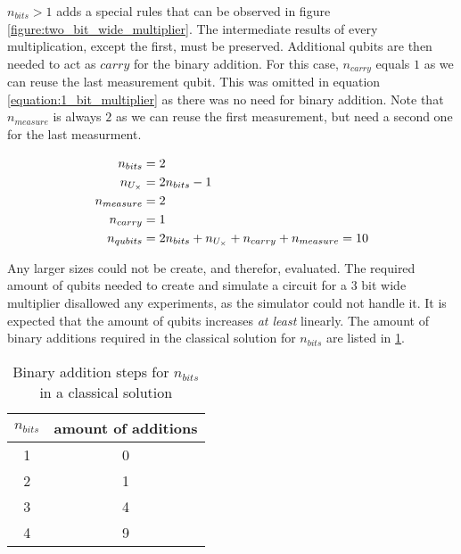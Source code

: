 $n_{bits} > 1$ adds a special rules that can be observed in figure \ref{figure:two_bit_wide_multiplier}. The intermediate results of every multiplication, except the first, must be preserved. Additional qubits are then needed to act as $carry$ for the binary addition. For this case, $n_{carry}$ equals $1$ as we can reuse the last measurement qubit. This was omitted in equation \ref{equation:1_bit_multiplier} as there was no need for binary addition. Note that $n_{measure}$ is always $2$ as we can reuse the first measurement, but need a second one for the last measurment.

\begin{equation}\label{equation:2_bit_multiplier}
\centering
    \begin{split}
        n_{bits} &= 2 \\
        n_{U_{\times}} &= 2n_{bits} -1 \\
        n_{measure} &= 2\\
        n_{carry} &= 1\\
        n_{qubits} &= 2n_{bits} + n_{U_{\times}} + n_{carry} + n_{measure} = 10
    \end{split}
\end{equation}

Any larger sizes could not be create, and therefor, evaluated. The required amount of qubits needed to create and simulate a circuit for a $3$ bit wide multiplier disallowed any experiments, as the  simulator could not handle it. It is expected that the amount of qubits increases \emph{at least} linearly. The amount of binary additions required in the classical solution for $n_{bits}$ are listed in \ref{table:amount_addition_binary_multiplication}.

\begin{table}[!h]
    \centering
    \begin{tabular}{|c|c|}
    \hline
    $n_{bits}$ & amount of additions \\ \hline
    1          & 0                   \\ \hline
    2          & 1                   \\ \hline
    3          & 4                   \\ \hline
    4          & 9                   \\ \hline
    \end{tabular}
    \caption{Binary addition steps for $n_{bits}$ in a classical solution}
    \label{table:amount_addition_binary_multiplication}
\end{table}



